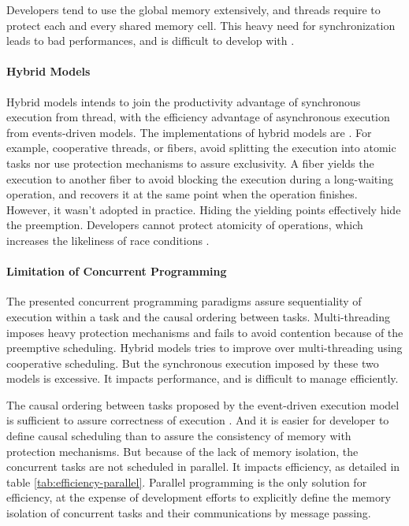 Developers tend to use the global memory extensively, and threads require to protect each and every shared memory cell.
This heavy need for synchronization leads to bad performances, and is difficult to develop with \cite{Adya2002}.

\paragraph{Hybrid Models}

Hybrid models intends to join the productivity advantage of synchronous execution from thread, with the efficiency advantage of asynchronous execution from events-driven models.
The implementations of hybrid models are .
For example, cooperative threads, or fibers, avoid splitting the execution into atomic tasks nor use protection mechanisms to assure exclusivity.
A fiber yields the execution to another fiber to avoid blocking the execution during a long-waiting operation, and recovers it at the same point when the operation finishes.
However, it wasn't adopted in practice.
Hiding the yielding points effectively hide the preemption.
Developers cannot protect atomicity of operations, which increases the likeliness of race conditions .

\paragraph{Limitation of Concurrent Programming}

The presented concurrent programming paradigms assure sequentiality of execution within a task and the causal ordering between tasks.
Multi-threading imposes heavy protection mechanisms and fails to avoid contention because of the preemptive scheduling.
Hybrid models tries to improve over multi-threading using cooperative scheduling.
But the synchronous execution imposed by these two models is excessive.
It impacts performance, and is difficult to manage efficiently.

The causal ordering between tasks proposed by the event-driven execution model is sufficient to assure correctness of execution \cite{Lamport1978,Reed2012}.
And it is easier for developer to define causal scheduling than to assure the consistency of memory with protection mechanisms.
But because of the lack of memory isolation, the concurrent tasks are not scheduled in parallel.
It impacts efficiency, as detailed in table \ref{tab:efficiency-parallel}.
Parallel programming is the only solution for efficiency, at the expense of development efforts to explicitly define the memory isolation of concurrent tasks and their communications by message passing.


